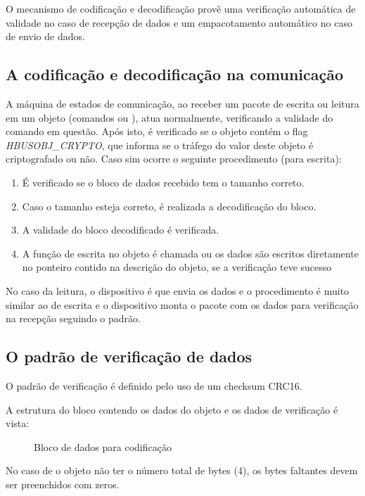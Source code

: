 O mecanismo de codificação e decodificação provê uma verificação automática de validade no caso de recepção de dados e um empacotamento automático no caso de envio de dados.

\subsection{A codificação e decodificação na comunicação}

A máquina de estados de comunicação, ao receber um pacote de escrita ou leitura em um objeto (comandos  ou ), atua normalmente, verificando a validade do comando em questão. Após isto, é verificado se o objeto contém o flag \textit{HBUSOBJ\_CRYPTO}, que informa se o tráfego do valor deste objeto é criptografado ou não. Caso sim ocorre o seguinte procedimento (para escrita):

\begin{enumerate}

\item É verificado se o bloco de dados recebido tem o tamanho correto.
\item Caso o tamanho esteja correto, é realizada a decodificação do bloco.
\item A validade do bloco decodificado é verificada.
\item A função de escrita no objeto é chamada ou os dados são escritos diretamente no ponteiro contido na descrição do objeto, se a verificação teve sucesso

\end{enumerate}

No caso da leitura, o dispositivo é que envia os dados e o procedimento é muito similar ao de escrita e o dispositivo monta o pacote com os dados para verificação na recepção seguindo o padrão.

\subsection{O padrão de verificação de dados}

O padrão de verificação é definido pelo uso de um checksum CRC16.

A estrutura do bloco contendo os dados do objeto e os dados de verificação é vista:

\begin{figure}[H]
\centering

\caption{Bloco de dados para codificação}
\end{figure}

No caso de o objeto não ter o número total de bytes (4), os bytes faltantes devem ser preenchidos com zeros.
